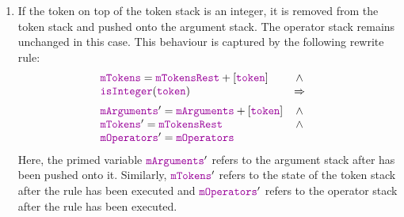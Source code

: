 \begin{enumerate}
\item If the token on top of the token stack is an integer, it is removed from the token stack and pushed onto
      the argument stack.  The operator stack remains unchanged in this case.
      This behaviour is captured by the following rewrite rule:
      $$\begin{array}{lcll}
          \mytt{mTokens} = \mytt{mTokensRest} + [\mytt{token} ] & \wedge & \\
          \mytt{isInteger}(\mytt{token}) & \Rightarrow  \\[0.2cm]
                   \mytt{mArguments}' = \mytt{mArguments} + [\mytt{token}] & \wedge \\
                   \mytt{mTokens}' = \mytt{mTokensRest} & \wedge \\
                   \mytt{mOperators}' = \mytt{mOperators}
       \end{array} 
     $$
      Here, the primed variable $\mytt{mArguments}'$ refers to the argument stack after  
      has been pushed onto it.  Similarly, $\mytt{mTokens}'$ refers to the state of the token stack after the
      rule has been executed and $\mytt{mOperators}'$ refers to the operator stack after the rule has been executed.
   

\end{enumerate}
